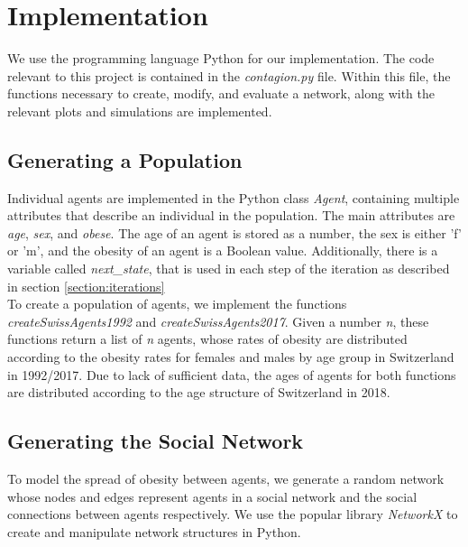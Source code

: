 \documentclass[11pt]{article}
\begin{document}
\section{Implementation}

We use the programming language Python for our implementation. The code relevant to this project is contained in the \textit{contagion.py} file. 
Within this file, the functions necessary to create, modify, and evaluate a network, along with the relevant plots and simulations are implemented.

\subsection{Generating a Population}

Individual agents are implemented in the Python class \textit{Agent}, containing multiple attributes that describe an individual in the population.
The main attributes are \textit{age}, \textit{sex}, and \textit{obese}. The age of an agent is stored as a number, the sex is either 'f' or 'm', and the obesity of an agent is a Boolean value. 
Additionally, there is a variable called \textit{next\_state}, that is used in each step of the iteration as described in section \ref{section:iterations} \\

To create a population of agents, we implement the functions \textit{createSwissAgents1992} and \textit{createSwissAgents2017}.
Given a number \textit{n}, these functions return a list of \textit{n} agents, whose rates of obesity are distributed according to the obesity rates\cite{bmistatistics} for females and males by age group in Switzerland in 1992/2017.
Due to lack of sufficient data, the ages of agents for both functions are distributed according to the age structure of Switzerland in 2018\cite{agestructure}.

\subsection{Generating the Social Network} \label{section:generating-network}

To model the spread of obesity between agents, we generate a random network whose nodes and edges represent agents in a social network and the social connections between agents respectively.
We use the popular library \textit{NetworkX} to create and manipulate network structures in Python. \\
\end{document}
